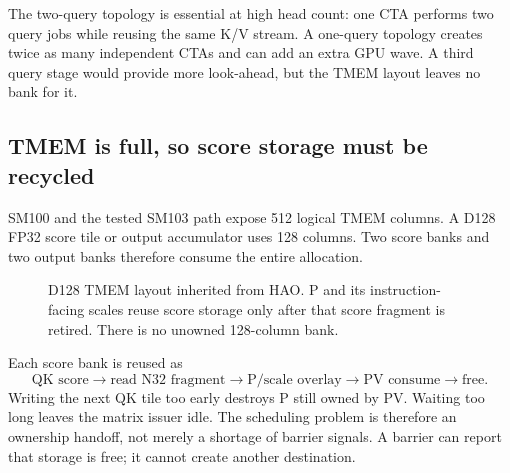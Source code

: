 The two-query topology is essential at high head count: one CTA performs two
query jobs while reusing the same K/V stream. A one-query topology creates
twice as many independent CTAs and can add an extra GPU wave. A third query
stage would provide more look-ahead, but the TMEM layout leaves no bank for it.

\subsection{TMEM is full, so score storage must be recycled}

SM100 and the tested SM103 path expose 512 logical TMEM columns. A D128 FP32
score tile or output accumulator uses 128 columns. Two score banks and two
output banks therefore consume the entire allocation.

\begin{figure}[htbp]
\centering
{}
\caption{D128 TMEM layout inherited from HAO. P and its instruction-facing
scales reuse score storage only after that score fragment is retired. There
is no unowned 128-column bank.}
\label{fig:tmem-layout}
\end{figure}

Each score bank is reused as
\begin{equation}
  \text{QK score}\rightarrow\text{read N32 fragment}
  \rightarrow\text{P/scale overlay}\rightarrow\text{PV consume}
  \rightarrow\text{free}.
  \label{eq:score-overlay}
\end{equation}
Writing the next QK tile too early destroys P still owned by PV. Waiting too
long leaves the matrix issuer idle. The scheduling problem is therefore an
ownership handoff, not merely a shortage of barrier signals. A barrier can
report that storage is free; it cannot create another destination.

